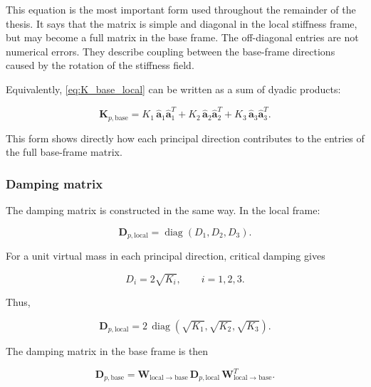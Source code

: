 This equation is the most important form used throughout the remainder of the
thesis. It says that the matrix is simple and diagonal in the local stiffness
frame, but may become a full matrix in the base frame. The off-diagonal
entries are not numerical errors. They describe coupling between the
base-frame directions caused by the rotation of the stiffness field.

Equivalently, \cref{eq:K_base_local} can be written as a sum of dyadic
products:

\begin{equation}
\label{eq:K_base_dyadic}
\mathbf{K}_{p,\mathrm{base}}
=
K_1\,\hat{\mathbf{a}}_1\hat{\mathbf{a}}_1^{T}
+
K_2\,\hat{\mathbf{a}}_2\hat{\mathbf{a}}_2^{T}
+
K_3\,\hat{\mathbf{a}}_3\hat{\mathbf{a}}_3^{T}.
\end{equation}

This form shows directly how each principal direction contributes to the
entries of the full base-frame matrix.

\subsubsection*{Damping matrix}

The damping matrix is constructed in the same way. In the local frame:

\begin{equation}
\label{eq:D_local}
\mathbf{D}_{p,\mathrm{local}}
=
\operatorname{diag}(D_1,D_2,D_3).
\end{equation}

For a unit virtual mass in each principal direction, critical damping gives

\begin{equation}
\label{eq:D_i_critical}
D_i = 2\sqrt{K_i},
\qquad i=1,2,3.
\end{equation}

Thus,

\begin{equation}
\label{eq:D_local_critical}
\mathbf{D}_{p,\mathrm{local}}
=
2\,\operatorname{diag}
\left(
\sqrt{K_1},\sqrt{K_2},\sqrt{K_3}
\right).
\end{equation}

The damping matrix in the base frame is then

\begin{equation}
\label{eq:D_base_local}
\mathbf{D}_{p,\mathrm{base}}
=
\mathbf{W}_{\mathrm{local}\rightarrow\mathrm{base}}\,
\mathbf{D}_{p,\mathrm{local}}\,
\mathbf{W}_{\mathrm{local}\rightarrow\mathrm{base}}^{T}.
\end{equation}

